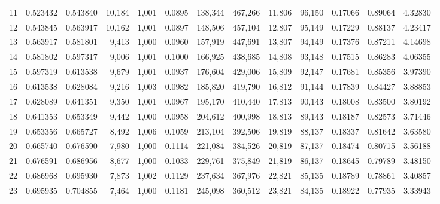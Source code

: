 \begin{tabular}{rrrrrrrrrrrrr}
11  &  0.523432 &  0.543840 &  10,184 &  1,001 &                                     0.0895 &  138,344 &  467,266 &   11,806 &   96,150 &  0.17066 &  0.89064 &  4.32830 \\
12  &  0.543845 &  0.563917 &  10,162 &  1,001 &                                     0.0897 &  148,506 &  457,104 &   12,807 &   95,149 &  0.17229 &  0.88137 &  4.23417 \\
13  &  0.563917 &  0.581801 &   9,413 &  1,000 &                                     0.0960 &  157,919 &  447,691 &   13,807 &   94,149 &  0.17376 &  0.87211 &  4.14698 \\
14  &  0.581802 &  0.597317 &   9,006 &  1,001 &                                     0.1000 &  166,925 &  438,685 &   14,808 &   93,148 &  0.17515 &  0.86283 &  4.06355 \\
15  &  0.597319 &  0.613538 &   9,679 &  1,001 &                                     0.0937 &  176,604 &  429,006 &   15,809 &   92,147 &  0.17681 &  0.85356 &  3.97390 \\
16  &  0.613538 &  0.628084 &   9,216 &  1,003 &                                     0.0982 &  185,820 &  419,790 &   16,812 &   91,144 &  0.17839 &  0.84427 &  3.88853 \\
17  &  0.628089 &  0.641351 &   9,350 &  1,001 &                                     0.0967 &  195,170 &  410,440 &   17,813 &   90,143 &  0.18008 &  0.83500 &  3.80192 \\
18  &  0.641353 &  0.653349 &   9,442 &  1,000 &                                     0.0958 &  204,612 &  400,998 &   18,813 &   89,143 &  0.18187 &  0.82573 &  3.71446 \\
19  &  0.653356 &  0.665727 &   8,492 &  1,006 &                                     0.1059 &  213,104 &  392,506 &   19,819 &   88,137 &  0.18337 &  0.81642 &  3.63580 \\
20  &  0.665740 &  0.676590 &   7,980 &  1,000 &                                     0.1114 &  221,084 &  384,526 &   20,819 &   87,137 &  0.18474 &  0.80715 &  3.56188 \\
21  &  0.676591 &  0.686956 &   8,677 &  1,000 &                                     0.1033 &  229,761 &  375,849 &   21,819 &   86,137 &  0.18645 &  0.79789 &  3.48150 \\
22  &  0.686968 &  0.695930 &   7,873 &  1,002 &                                     0.1129 &  237,634 &  367,976 &   22,821 &   85,135 &  0.18789 &  0.78861 &  3.40857 \\
23  &  0.695935 &  0.704855 &   7,464 &  1,000 &                                     0.1181 &  245,098 &  360,512 &   23,821 &   84,135 &  0.18922 &  0.77935 &  3.33943 \\

\end{tabular}
